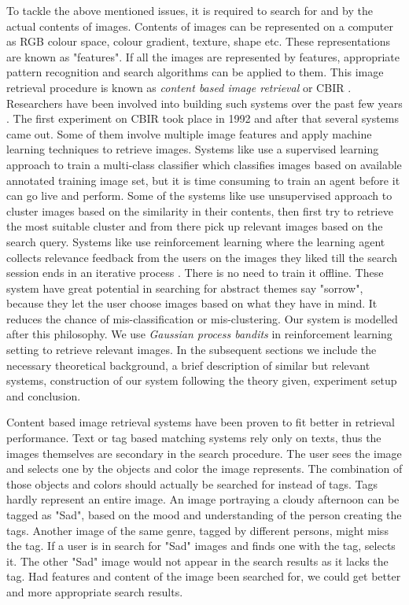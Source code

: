 \documentclass[english]{tktltiki}
\begin{document}
To tackle the above mentioned issues, it is required to search for and by the actual contents of images. Contents of images can be represented on a computer as RGB colour space, colour gradient, texture, shape etc. These representations are known as "features". If all the images are represented by features, appropriate pattern recognition and search algorithms can be applied to them. This image retrieval procedure is known as \textit{content based image retrieval} or CBIR \cite{cbir_1, cbir_2}. Researchers have been involved into building such systems over the past few years \cite{cbir_3, cbir_4}. The first experiment on CBIR took place in 1992 \cite{cbir_1st} and after that several systems came out. Some of them involve multiple image features and apply machine learning techniques to retrieve images. Systems like \cite{supervised_image_retrieval_1, supervised_image_retrieval_2} use a supervised learning approach to train a multi-class classifier which classifies images based on available annotated training image set, but it is time consuming to train an agent before it can go live and perform. Some of the systems like \cite{unsupervised_image_retrieval_1, unsupervised_image_retrieval_2} use unsupervised approach to cluster images based on the similarity in their contents, then first try to retrieve the most suitable cluster and from there pick up relevant images based on the search query. Systems like \cite{PicSOM} use reinforcement learning where the learning agent collects relevance feedback \cite{rel_feed} from the users on the images they liked till the search session ends in an iterative process \cite{pichunter, PicSOM, inter_rel_feed}. There is no need to train it offline. These system have great potential in searching for abstract themes say "sorrow", because they let the user choose images based on what they have in mind. It reduces the chance of mis-classification or mis-clustering. Our system is modelled after this philosophy. We use \textit{Gaussian process bandits} in reinforcement learning setting to retrieve relevant images. In the subsequent sections we include the necessary theoretical background, a brief description of similar but relevant systems, construction of our system following the theory given, experiment setup and conclusion. 

\iffalse
Content based image retrieval systems have been proven to fit better in retrieval performance. Text or tag based matching systems rely only on texts, thus the images themselves are secondary in the search procedure. The user sees the image and selects one by the objects and color the image represents. The combination of those objects and colors should actually be searched for instead of tags. Tags hardly represent an entire image. An image portraying a cloudy afternoon can be tagged as "Sad", based on the mood and understanding of the person creating the tags. Another image of the same genre, tagged by different persons, might miss the tag. If a user is in search for "Sad" images and finds one with the tag, selects it. The other "Sad" image would not appear in the search results as it lacks the tag. Had features and content of the image been searched for, we could get better and more appropriate search results.
\end{document}
